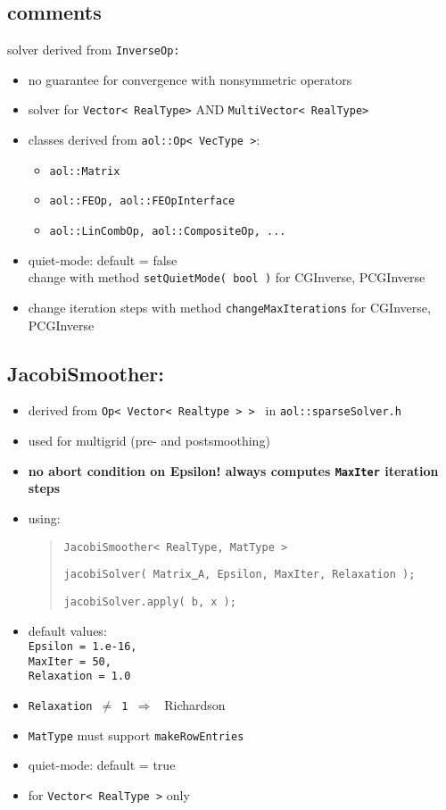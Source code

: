 
\subsection {comments}

solver derived from \texttt{InverseOp: }
\begin{itemize}
\item no guarantee for convergence with nonsymmetric operators
\item solver for \texttt{Vector< RealType>} AND \texttt{MultiVector< RealType> }
\item classes derived from \texttt{aol::Op< VecType >}:
\begin{itemize}
\item \texttt{aol::Matrix }
\item \texttt{aol::FEOp, aol::FEOpInterface }
\item \texttt{aol::LinCombOp, aol::CompositeOp, ... }
\end{itemize}
\item quiet-mode: default = false \\
change with method \texttt{setQuietMode( bool )} for CGInverse, PCGInverse
\item change iteration steps with method \texttt{changeMaxIterations} for CGInverse, PCGInverse
\end{itemize}



\subsection{JacobiSmoother: }
\begin{itemize}
\item derived from \texttt{Op< Vector< Realtype > > } in \texttt{aol::sparseSolver.h}
\item used for multigrid (pre- and postsmoothing)
\item \textbf{no abort condition on Epsilon! always computes \texttt{MaxIter} iteration steps}
\item using: \begin{quote}\texttt{JacobiSmoother< RealType, MatType > }
\begin{flushright} \texttt{jacobiSolver( Matrix\underline{ }A, Epsilon, MaxIter, Relaxation );} \end{flushright}
\texttt{jacobiSolver.apply( b, x );}
\end{quote}
\item default values: \\
\texttt{Epsilon = 1.e-16, \\ MaxIter = 50, \\ Relaxation = 1.0}
\item \texttt{Relaxation $\not=$ 1 $\Rightarrow$ } Richardson
\item \texttt{MatType} must support \texttt{makeRowEntries }
\item quiet-mode: default = true
\item for \texttt{Vector< RealType >} only
\end{itemize}


